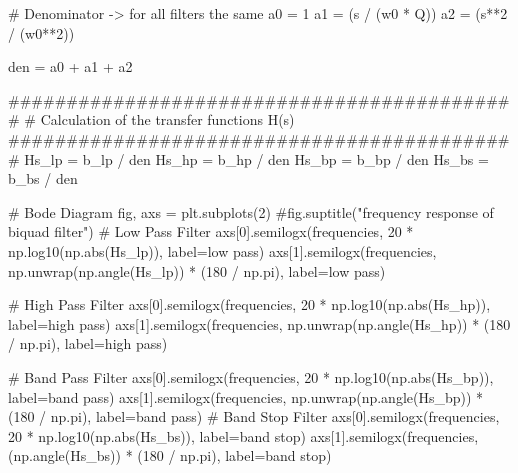 \documentclass[
  letterpaper,
]{scrbook}
\newenvironment{Shaded}{}{}
\newcommand{\BuiltInTok}[1]{\textcolor[rgb]{0.84,0.23,0.29}{#1}}
\newcommand{\CommentTok}[1]{\textcolor[rgb]{0.42,0.45,0.49}{#1}}
\newcommand{\DecValTok}[1]{\textcolor[rgb]{0.00,0.36,0.77}{#1}}
\newcommand{\NormalTok}[1]{\textcolor[rgb]{0.14,0.16,0.18}{#1}}
\newcommand{\OperatorTok}[1]{\textcolor[rgb]{0.14,0.16,0.18}{#1}}
\newcommand{\StringTok}[1]{\textcolor[rgb]{0.01,0.18,0.38}{#1}}
\begin{document}
\begin{codelisting}
{\begin{Shaded}
\begin{Highlighting}[]
\CommentTok{\# Denominator {-}\textgreater{} for all filters the same}
\NormalTok{a0 }\OperatorTok{=} \DecValTok{1}
\NormalTok{a1 }\OperatorTok{=}\NormalTok{ (s }\OperatorTok{/}\NormalTok{ (w0 }\OperatorTok{*}\NormalTok{ Q))}
\NormalTok{a2 }\OperatorTok{=}\NormalTok{ (s}\OperatorTok{**}\DecValTok{2} \OperatorTok{/}\NormalTok{ (w0}\OperatorTok{**}\DecValTok{2}\NormalTok{))}

\NormalTok{den }\OperatorTok{=}\NormalTok{ a0 }\OperatorTok{+}\NormalTok{ a1 }\OperatorTok{+}\NormalTok{ a2}

\CommentTok{\#\#\#\#\#\#\#\#\#\#\#\#\#\#\#\#\#\#\#\#\#\#\#\#\#\#\#\#\#\#\#\#\#\#\#\#\#\#\#\#\#\#\#\#}
\CommentTok{\# Calculation of the transfer functions H(s)}
\CommentTok{\#\#\#\#\#\#\#\#\#\#\#\#\#\#\#\#\#\#\#\#\#\#\#\#\#\#\#\#\#\#\#\#\#\#\#\#\#\#\#\#\#\#\#\#}
\NormalTok{Hs\_lp }\OperatorTok{=}\NormalTok{ b\_lp }\OperatorTok{/}\NormalTok{ den}
\NormalTok{Hs\_hp }\OperatorTok{=}\NormalTok{ b\_hp }\OperatorTok{/}\NormalTok{ den}
\NormalTok{Hs\_bp }\OperatorTok{=}\NormalTok{ b\_bp }\OperatorTok{/}\NormalTok{ den}
\NormalTok{Hs\_bs }\OperatorTok{=}\NormalTok{ b\_bs }\OperatorTok{/}\NormalTok{ den}

\CommentTok{\# Bode Diagram}
\NormalTok{fig, axs }\OperatorTok{=}\NormalTok{ plt.subplots(}\DecValTok{2}\NormalTok{)}
\CommentTok{\#fig.suptitle("frequency response of biquad filter")}
\CommentTok{\textquotesingle{}\textquotesingle{}\textquotesingle{}}
\CommentTok{\# Low Pass Filter}
\CommentTok{axs[0].semilogx(frequencies, 20 * np.log10(np.abs(Hs\_lp)), label=\textquotesingle{}low pass\textquotesingle{})}
\CommentTok{axs[1].semilogx(frequencies, np.unwrap(np.angle(Hs\_lp)) * (180 / np.pi), label=\textquotesingle{}low pass\textquotesingle{})}

\CommentTok{\# High Pass Filter}
\CommentTok{axs[0].semilogx(frequencies, 20 * np.log10(np.abs(Hs\_hp)), label=\textquotesingle{}high pass\textquotesingle{})}
\CommentTok{axs[1].semilogx(frequencies, np.unwrap(np.angle(Hs\_hp)) * (180 / np.pi), label=\textquotesingle{}high pass\textquotesingle{})}

\CommentTok{\# Band Pass Filter}
\CommentTok{axs[0].semilogx(frequencies, 20 * np.log10(np.abs(Hs\_bp)), label=\textquotesingle{}band pass\textquotesingle{})}
\CommentTok{axs[1].semilogx(frequencies, np.unwrap(np.angle(Hs\_bp)) * (180 / np.pi), label=\textquotesingle{}band pass\textquotesingle{})}
\CommentTok{\textquotesingle{}\textquotesingle{}\textquotesingle{}}
\CommentTok{\# Band Stop Filter}
\NormalTok{axs[}\DecValTok{0}\NormalTok{].semilogx(frequencies, }\DecValTok{20} \OperatorTok{*}\NormalTok{ np.log10(np.}\BuiltInTok{abs}\NormalTok{(Hs\_bs)), label}\OperatorTok{=}\StringTok{\textquotesingle{}band stop\textquotesingle{}}\NormalTok{)}
\NormalTok{axs[}\DecValTok{1}\NormalTok{].semilogx(frequencies, (np.angle(Hs\_bs)) }\OperatorTok{*}\NormalTok{ (}\DecValTok{180} \OperatorTok{/}\NormalTok{ np.pi), label}\OperatorTok{=}\StringTok{\textquotesingle{}band stop\textquotesingle{}}\NormalTok{)}


\end{Highlighting}
\end{Shaded}}
\end{codelisting}
\end{document}
